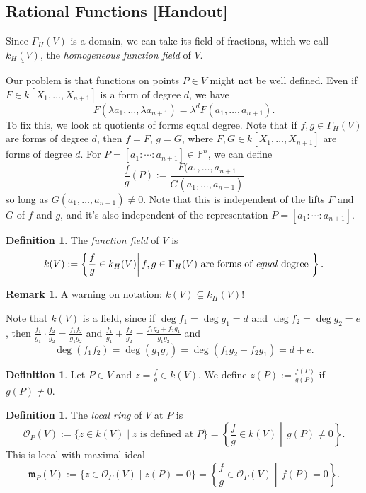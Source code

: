\documentclass[12pt]{article}
\newcommand{\ita}[1]{\textit{#1}}
\theoremstyle{definition}
\newtheorem{definition}[theorem]{Definition}
\newtheorem*{remark}{Remark}
\begin{document}
\subsection{Rational Functions [Handout]}
Since $\Gamma_H(V)$ is a domain, we can take its field of fractions, which we call $\underline{k_H(V)}$, the \ita{homogeneous function field} of $V$.

Our problem is that functions on points $P\in V$ might not be well defined. Even if $F\in k[X_1,\dotsc,X_{n+1}]$ is a form of degree $d$, we have
\[F(\lambda a_1,\dotsc,\lambda a_{n+1})=\lambda^d F(a_1,\dotsc,a_{n+1}).\]
To fix this, we look at quotients of forms equal degree. Note that if $f,g\in\Gamma_H(V)$ are forms of degree $d$, then $f=\overline{F}$, $g=\overline{G}$, where $F,G\in k[X_1,\dotsc,X_{n+1}]$ are forms of degree $d$. For $P=[a_1:\cdots:a_{n+1}]\in\mathbb{P}^n$, we can define
\[\frac{f}{g}(P):=\frac{F(a_1,\dotsc,a_{n+1}}{G(a_1,\dotsc,a_{n+1})}\]
so long as $G(a_1,\dotsc,a_{n+1})\neq0$. Note that this is independent of the lifts $F$ and $G$ of $f$ and $g$, and it's also independent of the representation $P=[a_1:\cdots:a_{n+1}]$.
\begin{definition}
    The \ita{function field} of $V$ is
    \begin{equation}
        k(V):=\left\{\frac{f}{g}\in k_H(V)\middle|\,f,g\in\Gamma_H(V)\text{ are forms of \ita{equal} degree }\right\}.
    \end{equation}
\end{definition}
\begin{remark}
   A warning on notation: $k(V)\subsetneq k_H(V)$!
\end{remark}
Note that $k(V)$ is a field, since if $\deg f_1=\deg g_1=d$ and $\deg f_2=\deg g_2=e$, then $\frac{f_1}{g_1}\cdot\frac{f_2}{g_2}=\frac{f_1f_2}{g_1g_2}$ and $\frac{f_1}{g_1}+\frac{f_2}{g_2}=\frac{f_1g_2+f_2g_1}{g_1g_2}$ and
\[\deg(f_1f_2)=\deg(g_1g_2)=\deg(f_1g_2+f_2g_1)=d+e.\]
\begin{definition}
    Let $P\in V$ and $z=\frac{f}{g}\in k(V)$. We define $z(P):=\frac{f(P)}{g(P)}$ if $g(P)\neq0$.
\end{definition}
\begin{definition}
    The \ita{local ring} of $V$ at $P$ is
    \begin{equation}
        \mathcal{O}_P(V):=\{z\in k(V)\mid z\text{ is defined at }P\}=\left\{\frac{f}{g}\in k(V)\middle|\,g(P)\neq0\right\}.
    \end{equation}
    This is local with maximal ideal
    \begin{equation}
        \mathfrak{m}_P(V):=\{z\in\mathcal{O}_P(V)\mid z(P)=0\}=\left\{\frac{f}{g}\in\mathcal{O}_P(V)\middle|\,f(P)=0\right\}.
    \end{equation}
\end{definition}
\end{document}
